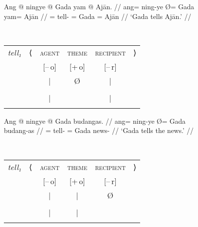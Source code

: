\begin{figure}
\pex\label{ex:intrnzn_act}
\a\label{ex:intrnzn_act_1}%
\ljudge\ques\begin{minipage}[t]{.4\remaining}
\begingl
	\gla Ang @ ningye {} @ Gada yam @ Ajān. //
	\glb ang= ning-ye Ø= Gada yam= Ajān //
	\glc \AgtT{}= tell-\TsgF{} \Top{}= Gada \Dat{}= Ajān //
	\glft `Gada tells Ajān.' //
\endgl
\end{minipage}
~
\begin{tabular}[t]{>{\itshape}l l c c c r}
tell₁
	& ⟨
	& \textsc{agent}
	& \textsc{theme}
	& \textsc{recipient}
	& ⟩
	\\
%
	& %
	& [–\,o]
	& [+\,o]
	& [–\,r]
	& %
	\\

%
	& %
	& |
	& Ø
	& |
	& %
	\\

%
	& %
	& \Subj*
	& %
	& \Obj
	& %
	\\

%
	& %
	& |
	& %
	& |
	& %
	\\

%
	& %
	& \fw{Gada}
	& %
	& \fw{Ajān}
	& %
	\\
\end{tabular}

\a\label{ex:intrnzn_act_2}%
\begin{minipage}[t]{.4\remaining}
\begingl
	\gla Ang @ ningye {} @ Gada budangas. //
	\glb ang= ning-ye Ø= Gada budang-as //
	\glc \AgtT{}= tell-\TsgF{} \Top{}= Gada news-\Parg{} //
	\glft `Gada tells the news.' //
\endgl
\end{minipage}
~
\begin{tabular}[t]{>{\itshape}l l c c c r}
tell₁
	& ⟨
	& \textsc{agent}
	& \textsc{theme}
	& \textsc{recipient}
	& ⟩
	\\
%
	& %
	& [–\,o]
	& [+\,o]
	& [–\,r]
	& %
	\\

%
	& %
	& |
	& |
	& Ø
	& %
	\\

%
	& %
	& \Subj*
	& \SObj
	& %
	& %
	\\

%
	& %
	& |
	& |
	& %
	& %
	\\

%
	& %
	& \fw{Gada}
	& \fw{news}
	& %
	& %
	\\
\end{tabular}

\xe
\end{figure}


